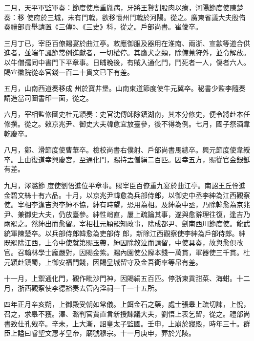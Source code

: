 \begin{pinyinscope}
 二月，天平軍監軍奏：節度使烏重胤病，牙將王贄割股肉以療，河陽節度使陳楚奏：移
 使府於三城，未有門戟，欲移懷州門戟於河陽。從之。廣東省議大夫殷侑奏禮部貢舉請置《三傳》、《三史》科，從之。戶部尚書。崔倰卒。



 三月丁已，宰臣百僚賜宴於曲江亭。敕應御服及器用在淮南、兩浙、宣歙等道合供進者，並端午誕節常例進獻者，一切權停。其鷹犬之類，除備蒐狩外，並令解放。以牛僧孺同中書門下平章事。日晡晚後，有賊入通化門，鬥死者一人，傷者六人。賜宣徽院從奉官錢一百二十貫文已下有差。



 五月，山南西道奏移成
 州於寶井堡。山南東道節度使牛元翼卒。秘書少監李隨奏請造當司圖書印一面，從之。



 六月，宰相監修圖史杜元穎奏：史官沈傳師除鎮湖南，其本分修史，便令將赴本任修撰。從之。敕京兆尹、御史大夫韓愈宜放臺參，後不得為例。七月，國子祭酒韋乾慶卒。



 八月，鄭、滑節度使曹華卒。檢校尚書右僕射、戶部尚書馬總卒。興元節度使韋綬卒。上由復道幸興慶宮，至通化門，賜持盂僧絹二百匹。因幸五方，賜從官金銀鋌有差。



 九月，澤潞節
 度使劉悟進位平章事。賜宰臣百僚重九宴於曲江亭。南詔王丘佺進金碧文絲十有六品。十月，以京兆尹韓愈為兵部侍郎，以御史中丞李紳為江西觀察使。宰相李逢吉與李紳不協，紳有時望，恐用為相。及紳為中丞，乃除韓愈為京兆尹、兼御史大夫，仍放臺參。紳性峭直，屢上疏論其事，遂與愈辭理往復，逢吉乃兩罷之。然紳出而愈留。宰相杜元穎罷知政事，除成都尹、劍南西川節度使。龍武統軍陳楚卒。以兵部侍郎韓愈為吏部侍
 郎，新除江西觀察使李紳為戶部侍郎。紳既罷除江西，上令中使就第賜玉帶，紳因除敘泣而請留，中使具奏，故與愈俱改官。召翰林學士龐嚴對，因賜金紫。賜內園使公廨本錢一萬貫，軍器使三千貫。杜元穎赴鎮蜀，上御安福門餞，因賜皇城留守及金吾衛率等帛有差。



 十一月，上禦通化門，觀作毗沙門神，因賜絹五百匹。停浙東貢甜菜、海蚶。十二月，浙西觀察使李德裕奏去管內淫祠一千一十五所。



 四年正月辛亥朔，上御殿受朝如常儀。上餌金石之藥，處士張皋上疏切諫，上悅，召之，求皋不獲。澤、潞判官賈直言新授諫議大夫，劉悟上表乞留，從之。禮部尚書致仕孔戣卒。辛未，上大漸，詔皇太子監國。壬申，上崩於寢殿，時年三十。群臣上謚曰睿聖文惠孝皇帝，廟號穆宗。十一月庚申，葬於光陵。




\end{pinyinscope}
